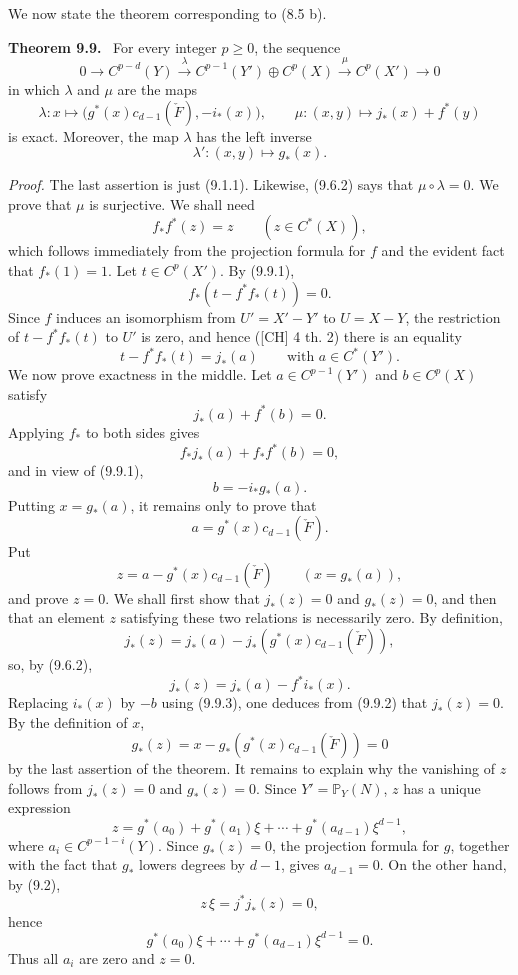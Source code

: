 \documentclass[11pt]{article}
\newenvironment{statement}[1]{\par\medskip\noindent\textbf{#1.}\ }{\par\medskip}
\begin{document}
We now state the theorem corresponding to (8.5 b).

\begin{statement}{Theorem 9.9}
For every integer $p\ge0$, the sequence
\[
0\to C^{p-d}(Y)\xrightarrow{\lambda} C^{p-1}(Y')\oplus C^p(X)\xrightarrow{\mu} C^p(X')\to0
\]
in which $\lambda$ and $\mu$ are the maps
\[
\lambda:x\mapsto\bigl(g^*(x)c_{d-1}(\check F),-i_*(x)\bigr),
\qquad
\mu:(x,y)\mapsto j_*(x)+f^*(y)
\]
is exact. Moreover, the map $\lambda$ has the left inverse
\[
\lambda':(x,y)\mapsto g_*(x).
\]
\end{statement}

\emph{Proof.} The last assertion is just (9.1.1). Likewise, (9.6.2) says that $\mu\circ\lambda=0$. We prove that $\mu$ is surjective. We shall need
\[
f_*f^*(z)=z\qquad(z\in C^*(X)),
\tag{9.9.1}
\]
which follows immediately from the projection formula for $f$ and the evident fact that $f_*(1)=1$. Let $t\in C^p(X')$. By (9.9.1),
\[
f_*(t-f^*f_*(t))=0.
\]
Since $f$ induces an isomorphism from $U'=X'-Y'$ to $U=X-Y$, the restriction of $t-f^*f_*(t)$ to $U'$ is zero, and hence ([CH] 4 th. 2) there is an equality
\[
t-f^*f_*(t)=j_*(a)
\qquad\text{with }a\in C^*(Y').
\]
We now prove exactness in the middle. Let $a\in C^{p-1}(Y')$ and $b\in C^p(X)$ satisfy
\[
j_*(a)+f^*(b)=0.
\tag{9.9.2}
\]
Applying $f_*$ to both sides gives
\[
f_*j_*(a)+f_*f^*(b)=0,
\]
and in view of (9.9.1),
\[
b=-i_*g_*(a).
\tag{9.9.3}
\]
Putting $x=g_*(a)$, it remains only to prove that
\[
a=g^*(x)c_{d-1}(\check F).
\tag{9.9.4}
\]
Put
\[
z=a-g^*(x)c_{d-1}(\check F)\qquad(x=g_*(a)),
\]
and prove $z=0$. We shall first show that $j_*(z)=0$ and $g_*(z)=0$, and then that an element $z$ satisfying these two relations is necessarily zero. By definition,
\[
j_*(z)=j_*(a)-j_*(g^*(x)c_{d-1}(\check F)),
\]
so, by (9.6.2),
\[
j_*(z)=j_*(a)-f^*i_*(x).
\]
Replacing $i_*(x)$ by $-b$ using (9.9.3), one deduces from (9.9.2) that $j_*(z)=0$. By the definition of $x$,
\[
g_*(z)=x-g_*(g^*(x)c_{d-1}(\check F))=0
\]
by the last assertion of the theorem. It remains to explain why the vanishing of $z$ follows from $j_*(z)=0$ and $g_*(z)=0$. Since $Y'=\mathbb P_Y(N)$, $z$ has a unique expression
\[
z=g^*(a_0)+g^*(a_1)\xi+\cdots+g^*(a_{d-1})\xi^{d-1},
\]
where $a_i\in C^{p-1-i}(Y)$. Since $g_*(z)=0$, the projection formula for $g$, together with the fact that $g_*$ lowers degrees by $d-1$, gives $a_{d-1}=0$. On the other hand, by (9.2),
\[
z\,\xi=j^*j_*(z)=0,
\]
hence
\[
g^*(a_0)\xi+\cdots+g^*(a_{d-1})\xi^{d-1}=0.
\]
Thus all $a_i$ are zero and $z=0$.
\end{document}
